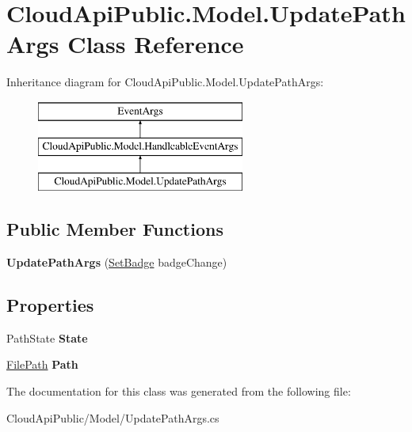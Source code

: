 \hypertarget{class_cloud_api_public_1_1_model_1_1_update_path_args}{\section{Cloud\-Api\-Public.\-Model.\-Update\-Path\-Args Class Reference}
\label{class_cloud_api_public_1_1_model_1_1_update_path_args}
}
Inheritance diagram for Cloud\-Api\-Public.\-Model.\-Update\-Path\-Args\-:\begin{figure}[H]
\begin{center}
\leavevmode
\includegraphics[height=3.000000cm]{class_cloud_api_public_1_1_model_1_1_update_path_args}
\end{center}
\end{figure}
\subsection*{Public Member Functions}
\begin{DoxyCompactItemize}
\item 
\hypertarget{class_cloud_api_public_1_1_model_1_1_update_path_args_a1752ecb72d6868de7764aa8c47d5d5df}{{\bfseries Update\-Path\-Args} (\hyperlink{struct_cloud_api_public_1_1_model_1_1_set_badge}{Set\-Badge} badge\-Change)}\label{class_cloud_api_public_1_1_model_1_1_update_path_args_a1752ecb72d6868de7764aa8c47d5d5df}

\end{DoxyCompactItemize}
\subsection*{Properties}
\begin{DoxyCompactItemize}
\item 
\hypertarget{class_cloud_api_public_1_1_model_1_1_update_path_args_a38826dbd13751f98843975d130e7c634}{Path\-State {\bfseries State}}\label{class_cloud_api_public_1_1_model_1_1_update_path_args_a38826dbd13751f98843975d130e7c634}

\item 
\hypertarget{class_cloud_api_public_1_1_model_1_1_update_path_args_ae2123d66755bf11691fa599ef915bead}{\hyperlink{class_cloud_api_public_1_1_model_1_1_file_path}{File\-Path} {\bfseries Path}}\label{class_cloud_api_public_1_1_model_1_1_update_path_args_ae2123d66755bf11691fa599ef915bead}

\end{DoxyCompactItemize}


The documentation for this class was generated from the following file\-:\begin{DoxyCompactItemize}
\item 
Cloud\-Api\-Public/\-Model/Update\-Path\-Args.\-cs\end{DoxyCompactItemize}
